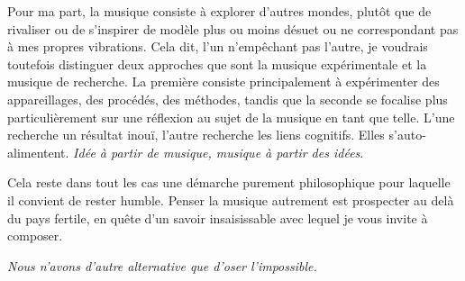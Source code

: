 Pour ma part, la musique consiste à explorer d'autres mondes, plutôt que de rivaliser ou de s'inspirer de modèle plus ou moins désuet ou ne correspondant pas à mes propres vibrations. Cela dit, l'un n'empêchant pas l'autre, je voudrais toutefois distinguer deux approches que sont la musique expérimentale et la musique de recherche. La première consiste principalement à expérimenter des appareillages, des procédés, des méthodes, tandis que la seconde se focalise plus particulièrement sur une réflexion au sujet de la musique en tant que telle. L'une recherche un résultat inouï, l'autre recherche les liens cognitifs. Elles s'auto-alimentent. \textit{Idée à partir de musique, musique à partir des idées}.

Cela reste dans tout les cas une démarche purement philosophique pour laquelle il convient de rester humble. Penser la musique autrement est prospecter au delà du pays fertile, en quête d’un savoir insaisissable avec lequel je vous invite à composer. 

\bigskip

\textit{Nous n’avons d’autre alternative que d’oser l’impossible.}

